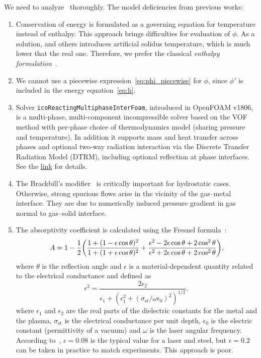 \documentclass[final]{elsarticle} %
\newcommand{\OpenFOAM}{OpenFOAM\textregistered\xspace}
\begin{document}
We need to analyze~\cite{cook2019simulation} thoroughly.
The model deficiencies from previous works:
\begin{enumerate}
    \item Conservation of energy is formulated as a governing equation for temperature instead of enthalpy.
    This approach brings difficulties for evaluation of $\phi$.
    As a solution, \citet{wang2019powder} and others introduces artificial solidus temperature,
    which is much lower that the real one.
    Therefore, we prefer the classical \emph{enthalpy formulation}~\cite{fedorenko1975difference}.
    \item We cannot use a piecewise expression~\eqref{eq:phi_piecewise} for $\phi$, since $\phi'$ is included in the energy equation~\eqref{eq:h}. 
    \item Solver \texttt{icoReactingMultiphaseInterFoam}, introduced in
    \OpenFOAM v1806, is a multi-phase, multi-component incompressible solver based on the VOF method with per-phase choice of thermodynamics model (sharing pressure and temperature). In addition it supports mass and heat transfer across phases and optional two-way radiation interaction via the Discrete Transfer Radiation Model (DTRM), including optional reflection at phase interfaces.
    See the \href{https://www.openfoam.com/releases/openfoam-v1806/solver-and-physics.php}{link} for details.
    \item The Brackbill's modifier~\cite{brackbill1992continuum} is critically important
    for hydrostatic cases.
    Otherwise, strong spurious flows arise in the vicinity of the gas--metal interface.
    They are due to numerically induced pressure gradient in gas normal to gas--solid interface.
    \item The absorptivity coefficient is calculated using the Fresnel formula~\cite{schulz1987laser}:
    \begin{equation*}
        A = 1 - \frac12\qty(
            \frac{1+(1-\epsilon\cos\theta)^2}{1+(1+\epsilon\cos\theta)^2}
          + \frac{\epsilon^2-2\epsilon\cos\theta+2\cos^2\theta}{\epsilon^2+2\epsilon\cos\theta+2\cos^2\theta}
        ),
    \end{equation*}
    where $\theta$ is the reflection angle and
    $\epsilon$ is a material-dependent quantity related to the electrical conductance
    and defined as
    \begin{equation*}
        \epsilon^2 = \frac{2\epsilon_2}{\epsilon_1 + (\epsilon_1^2
            + (\sigma_\text{st}/\omega\epsilon_0)^2)^{1/2}},
    \end{equation*}
    where $\epsilon_1$ and $\epsilon_2$ are the real parts of the dielectric constants
    for the metal and the plasma,
    $\sigma_\text{st}$ is the electrical conductance per unit depth,
    $\epsilon_0$ is the electric constant (permittivity of a vacuum)
    and $\omega$ is the laser angular frequency.
    According to~\cite{ducharme1994laser},
    $\epsilon=0.08$ is the typical value for a  laser and steel,
    but $\epsilon=0.2$ can be taken in practice to match experiments.
    This approach is poor.
\end{enumerate}
\end{document}
